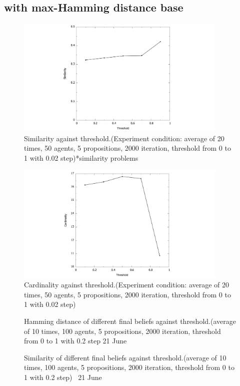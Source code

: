 \documentclass[a4paper,12pt]{article}
\begin{document}
\subsection{with max-Hamming distance base}
\begin{figure}[H]
	\centering
	\includegraphics[width=0.9\textwidth]{MaxTH_simpdf}
	\caption{Similarity against threshold.(Experiment condition: average of 20 times, 50 agents, 5 propositions, 2000 iteration, threshold from 0 to 1 with 0.02 step)*similarity problems}\label{MaxTH_simpdf}
\end{figure}
%
\begin{figure}[H]
	\centering
	\includegraphics[width=0.9\textwidth]{MaxTH_cardpdf}
	\caption{Cardinality against threshold.(Experiment condition: average of 20 times, 50 agents, 5 propositions, 2000 iteration, threshold from 0 to 1 with 0.02 step)}\label{MaxTH_cardpdf}
\end{figure}
%
\begin{figure}[H]
	\centering
	
	\caption{Hamming distance of different final beliefs against threshold.(average of 10 times, 100 agents, 5 propositions, 2000 iteration, threshold from 0 to 1 with 0.2 step {\color{red} 21 June}}
\end{figure}
\begin{figure}[H]
	\centering
	
	\caption{Similarity of different final beliefs against threshold.(average of 10 times, 100 agents, 5 propositions, 2000 iteration, threshold from 0 to 1 with 0.2 step)~{\color{red} 21 June}}
\end{figure}
\end{document}
